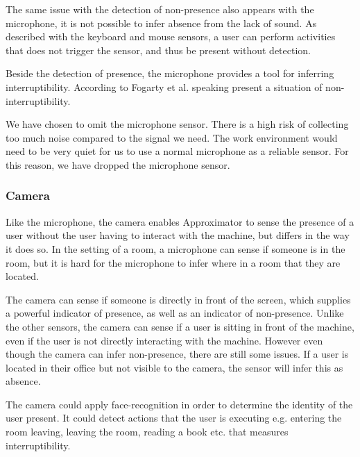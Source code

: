 \documentclass{sigchi}
\begin{document}
The same issue with the detection of non-presence also appears with the microphone, it is not possible to infer absence from the lack of sound.
As described with the keyboard and mouse sensors, a user can perform activities that does not trigger the sensor, and thus be present without detection.

Beside the detection of presence, the microphone provides a tool for inferring interruptibility.
According to Fogarty et al. \cite{fogarty2005predicting} speaking present a situation of non-interruptibility.

We have chosen to omit the microphone sensor.
There is a high risk of collecting too much noise compared to the signal we need.
The work environment would need to be very quiet for us to use a normal microphone as a reliable sensor.
For this reason, we have dropped the microphone sensor.

\subsubsection{Camera}
Like the microphone, the camera enables Approximator to sense the presence of a user without the user having to interact with the machine, but differs in the way it does so.
In the setting of a room, a microphone can sense if someone is in the room, but it is hard for the microphone to infer where in a room that they are located.

The camera can sense if someone is directly in front of the screen, which supplies a powerful indicator of presence, as well as an indicator of non-presence.
Unlike the other sensors, the camera can sense if a user is sitting in front of the machine, even if the user is not directly interacting with the machine.
However even though the camera can infer non-presence, there are still some issues.
If a user is located in their office but not visible to the camera, the sensor will infer this as absence.

The camera could apply face-recognition in order to determine the identity of the user present.
It could detect actions that the user is executing e.g. entering the room leaving, leaving the room, reading a book etc. that measures interruptibility.
\end{document}
